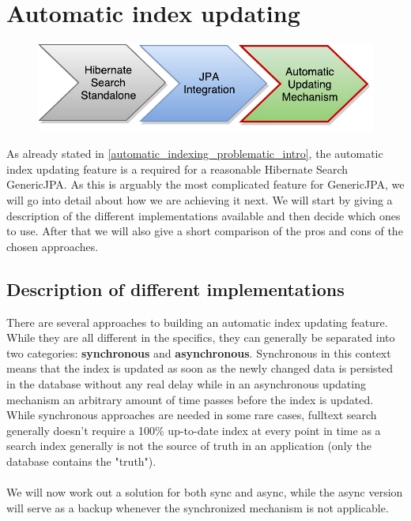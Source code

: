 ~
\pagebreak

\section{Automatic index updating} \label{automatic_indexing_chapter}

\begin{figure}[ht]
	\centering
	\includegraphics[scale=0.75]{images/timeline_genericjpa_third.pdf}
	\label{project_timeline_third}
\end{figure}
\noindent
As already stated in \ref{automatic_indexing_problematic_intro}, the automatic index updating feature is a required for a reasonable Hibernate Search GenericJPA. As this is arguably the most complicated feature for GenericJPA, we will go into detail about how we are achieving it next. We will start by giving a description of the different implementations available and then decide which ones to use. After that we will also give a short comparison of the pros and cons of the chosen approaches.

\pagebreak

\subsection{Description of different implementations} \label{description_of_different_implementations}

There are several approaches to building an automatic index updating feature. While they are all different in the specifics, they can generally be separated into two categories: \textbf{synchronous} and \textbf{asynchronous}. Synchronous in this context means that the index is updated as soon as the newly changed data is persisted in the database without any real delay while in an asynchronous updating mechanism an arbitrary amount of time passes before the index is updated. While synchronous approaches are needed in some rare cases, fulltext search generally doesn't require a 100\% up-to-date index at every point in time  as a search index generally is not the source of truth in an application (only the database contains the "truth").
\\\\
We will now work out a solution for both sync and async, while the async version will serve as a backup whenever the synchronized mechanism is not applicable.


